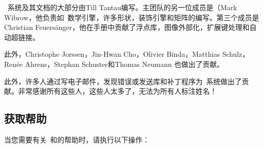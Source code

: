 
\pgfname\ 系统及其文档的大部分由Till Tantau编写。主团队的另一位成员是（Mark Wibrow，他负责如\pgfname\ 数学引擎，许多形状，装饰引擎和矩阵的编写。第三个成员是Christian Feuers\"anger，他在手册中贡献了浮点库，图像外部化，扩展键处理和自动超链接。


此外，Christophe Jorssen，Jin-Hwan Cho，Olivier Binda，Matthias Schulz，Ren\'ee Ahrens，Stephan Schuster和Thomas Neumann 也做出了贡献。


此外，许多人通过写电子邮件，发现错误或发送库和补丁程序为\pgfname\ 系统做出了贡献。非常感谢所有这些人，这些人太多了，无法为所有人标注姓名！

\subsection{获取帮助}


当您需要有关\pgfname\ 和\tikzname 的帮助时，请执行以下操作：

